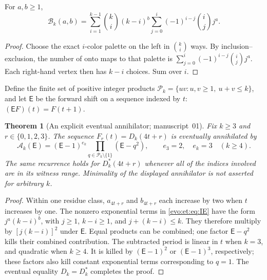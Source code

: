 \documentclass[11pt,a4paper]{article}
\numberwithin{equation}{section}
\newtheorem{theorem}{Theorem}[section]
\theoremstyle{definition}
\theoremstyle{remark}
\newcommand{\Bip}{\mathcal B}
\begin{document}
\begin{lemma}\label{evo:et:lem:IE}
For $a,b\ge1$,
\begin{equation}\label{evo:et:eq:IE}
 \Bip_k(a,b)=\sum_{i=1}^{k-1}\binom{k}{i}(k-i)^b
       \sum_{j=0}^{i}(-1)^{i-j}\binom{i}{j}j^a.
\end{equation}
\end{lemma}
\begin{proof}
Choose the exact $i$-color palette on the left in $\binom ki$ ways. By
inclusion--exclusion, the number of onto maps to that palette is
$\sum_{j=0}^i(-1)^{i-j}\binom ij j^a$. Each right-hand vertex then has $k-i$
choices. Sum over $i$.
\end{proof}

Define the finite set of positive integer products
$\mathcal P_k=\{uv:u,v\ge1,\ u+v\le k\}$, and let $\mathsf E$ be the forward
shift on a sequence indexed by $t$: $(\mathsf EF)(t)=F(t+1)$.

\begin{theorem}[An explicit eventual annihilator; manuscript~01]\label{evo:et:thm:recurrence}
Fix $k\ge3$ and $r\in\{0,1,2,3\}$. The sequence $F_r(t)=D_k(4t+r)$ is
eventually annihilated by
\begin{equation}\label{evo:et:eq:annihilator}
 \mathcal A_k(\mathsf E)=(\mathsf E-1)^{e_k}
       \prod_{q\in\mathcal P_k\setminus\{1\}}(\mathsf E-q^2),
 \qquad e_3=2,\quad e_k=3\quad(k\ge4).
\end{equation}
The same recurrence holds for $D^*_k(4t+r)$ whenever all of the indices
involved are in its witness range. Minimality of the displayed annihilator is
not asserted for arbitrary $k$.
\end{theorem}
\begin{proof}
Within one residue class, $a_{4t+r}$ and $b_{4t+r}$ each increase by two when
$t$ increases by one. The nonzero exponential terms in \eqref{evo:et:eq:IE}
have the form $j^a(k-i)^b$, with $j\ge1$, $k-i\ge1$, and $j+(k-i)\le k$. They
therefore multiply by $[j(k-i)]^2$ under $\mathsf E$. Equal products can be
combined; one factor $\mathsf E-q^2$ kills their combined contribution. The
subtracted period is linear in $t$ when $k=3$, and quadratic when $k\ge4$. It
is killed by $(\mathsf E-1)^2$ or $(\mathsf E-1)^3$, respectively; these
factors also kill constant exponential terms corresponding to $q=1$. The
eventual equality $D_k=D^*_k$ completes the proof.
\end{proof}
\end{document}
